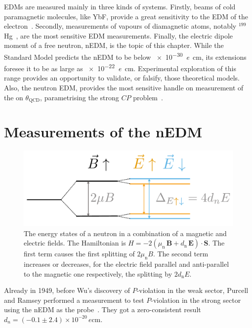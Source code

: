 EDMs are measured mainly in three kinds of systems. Firstly, beams of cold paramagnetic molecules, like YbF, provide a great sensitivity to the EDM of the electron~\cite{Hudson2011}. Secondly, measurements of vapours of diamagnetic atoms, notably $^{199}$Hg~\cite{PhysRevLett.116.161601}, are the most sensitive EDM measurements. Finally, the electric dipole moment of a free neutron, nEDM, is the topic of this chapter. While the Standard Model predicts the nEDM to be below \SI{e-30}{\elementarycharge\centi\meter}, its extensions foresee it to be
as large as \SI{e-22}{\elementarycharge\centi\meter}.
Experimental exploration of this range provides an opportunity to validate, or falsify, those theoretical models. Also, the neutron EDM, provides the most sensitive handle on measurement of the on $\theta_\text{QCD}$, parametrising the strong $CP$ problem~\cite{PDG2016}.



\section{Measurements of the nEDM}

\begin{figure}
  \centering
  \includegraphics[width=0.7\linewidth]{gfx/introduction/measurement_principle.pdf}
  \caption{The energy states of a neutron in a combination of a magnetic and electric fields. The Hamiltonian is $H = - 2 \left( \mu_\text{n} \, \mathbf{B} + d_\text{n} \, \mathbf{E} \right ) \cdot \mathbf{S}$. The first term causes the first splitting of $2\mu_\text{n} B$. The second term increases or decreases, for the electric field parallel and anti-parallel to the magnetic one respectively, the splitting by $2 d_\text{n} E$.}\label{fig:nEDM_measurement_principle}
\end{figure}

Already in 1949, before Wu's discovery of $P$-violation in the weak sector, Purcell and Ramsey performed a measurement to test $P$-violation in the strong sector using the nEDM as the probe~\cite{PhysRev.108.120}. They got a zero-consistent result $d_n = (-0.1 \pm 2.4) \times 10^{-20}\,\si{\elementarycharge\centi\meter}$.

